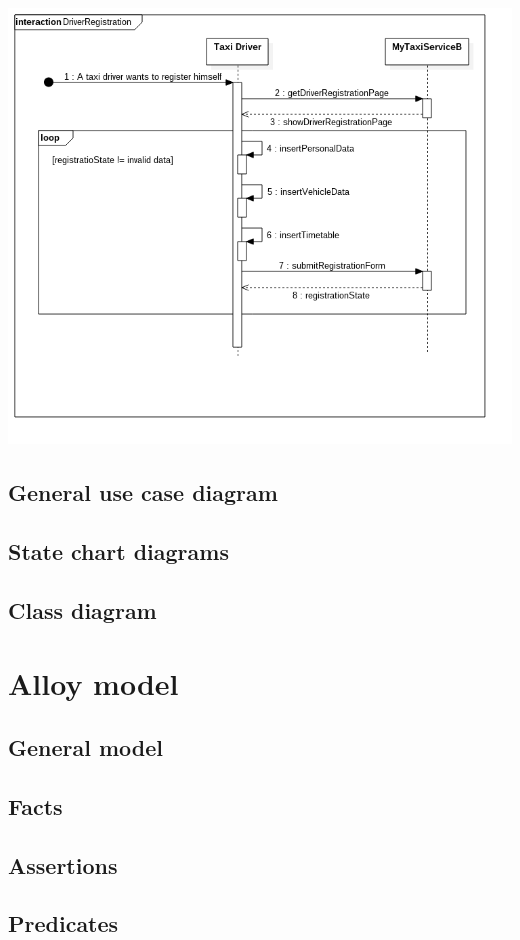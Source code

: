 \documentclass[11pt]{article} %
\begin{document}
\begin{enumerate}
		\begin{center}
		\includegraphics[scale=0.52]{usecase12.png}
		\end{center}
	\end{enumerate}
	\newpage
	\subsection{General use case diagram}

	\subsection{State chart diagrams}

	\subsection{Class diagram}

	\section{Alloy model}

	\subsection{General model}
	\subsection{Facts}
	\subsection{Assertions}
	\subsection{Predicates}
\end{document}
